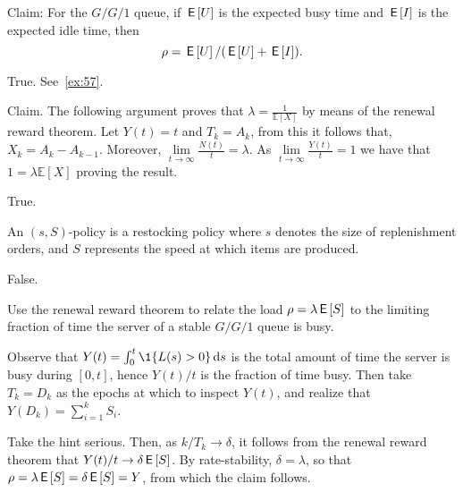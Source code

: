 \documentclass[stochastic-or.tex]{subfiles}
\begin{document}
\begin{truefalse}
Claim:  For the $G/G/1$ queue, if $\,\mathsf{E}\left[U\right]$ is the expected busy time and
 $\,\mathsf{E}\left[I\right]$ is the expected idle time, then
\begin{equation*}
\rho =  \,\mathsf{E}\left[U\right] / (\,\mathsf{E}\left[U\right] +\,\mathsf{E}\left[I\right]).
\end{equation*}
\begin{solution} True. See~\cref{ex:57}.
\end{solution}
\end{truefalse}

\begin{truefalse}
Claim.
The following argument proves that $\lambda=\frac{1}{\mathbb{E}[X]}$ by means of the renewal reward theorem.
Let $Y(t)=t$ and $T_k=A_k$, from this it follows that, $X_k=A_k-A_{k-1}$.
Moreover, $\lim\limits_{t\to\infty}\frac{N(t)}{t}=\lambda$.
As $\lim\limits_{t\to\infty}\frac{Y(t)}{t}=1$ we have that $1=\lambda\mathbb{E}[X]$ proving the result.
\begin{solution}
        True.
\end{solution}
\end{truefalse}

\begin{truefalse}
    An $(s,S)$-policy is a restocking policy where $s$ denotes the size of replenishment orders, and $S$ represents the speed at which items are produced.
\begin{solution}
        False.
\end{solution}
\end{truefalse}


\begin{exercise}
Use the renewal reward theorem to relate the load $\rho=\lambda \,\mathsf{E}\left[S\right]$ to the limiting fraction of time the server of a stable $G/G/1$ queue is busy.
\begin{hint}
Observe that $Y(t) = \int_0^t \1{\L(s)>0} \d s$ is the total amount of time the server is busy during $[0,t]$, hence $Y(t)/t$ is the fraction of time busy.
Then take $T_k = D_k$ as the epochs at which to inspect $Y(t)$, and realize that $Y(D_{k}) = \sum_{i=1}^{k} S_{i}$.
\end{hint}
\begin{solution}
Take the hint serious. Then, as $k/T_{k} \to \delta$, it follows from the renewal reward theorem that $Y(t)/t \to \delta \,\mathsf{E}\left[S\right]$.
By rate-stability, $\delta = \lambda$, so that $\rho=\lambda \,\mathsf{E}\left[S\right] = \delta \,\mathsf{E}\left[S\right] = Y$, from which the claim follows.

\end{solution}
\end{exercise}
\end{document}
